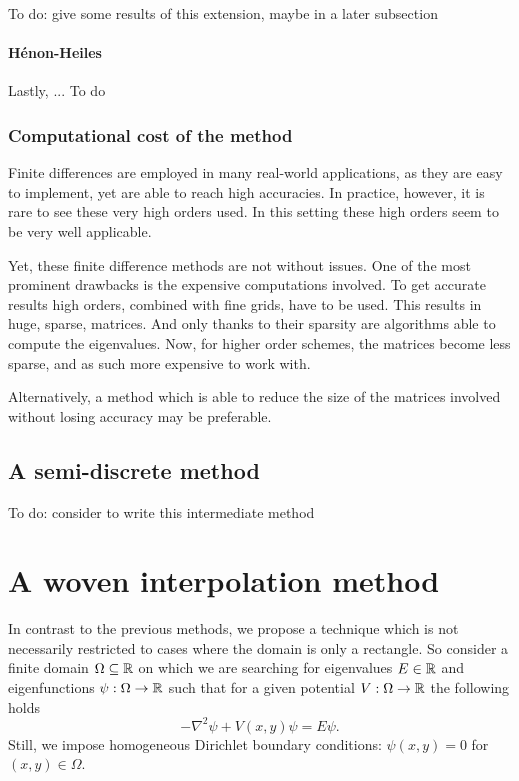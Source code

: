 {\color{red}To do: give some results of this extension, maybe in a later subsection}

\paragraph{Hénon-Heiles} Lastly, ... {\color{red}To do}


\subsubsection{Computational cost of the method}

Finite differences are employed in many real-world applications, as they are easy to implement, yet are able to reach high accuracies. In practice, however, it is rare to see these very high orders used. In this setting these high orders seem to be very well applicable.

Yet, these finite difference methods are not without issues. One of the most prominent drawbacks is the expensive computations involved. To get accurate results high orders, combined with fine grids, have to be used. This results in huge, sparse, matrices. And only thanks to their sparsity are algorithms able to compute the eigenvalues. Now, for higher order schemes, the matrices become less sparse, and as such more expensive to work with.

Alternatively, a method which is able to reduce the size of the matrices involved without losing accuracy may be preferable.

\subsection{A semi-discrete method}\label{sec:c4_semi_discrete}

{\color{red} To do: consider to write this intermediate method}

\section{A woven interpolation method}

In contrast to the previous methods, we propose a technique which is not necessarily restricted to cases where the domain is only a rectangle. So consider a finite domain $\Omega \subseteq \mathbb{R}$ on which we are searching for eigenvalues $E \in \mathbb{R}$ and eigenfunctions $\psi: \Omega \to \mathbb{R}$ such that for a given potential $V : \Omega \to \mathbb{R}$ the following holds
\begin{equation}\label{equ:c4_schrodinger_equation_new_method}
    -\nabla^2 \psi + V(x, y) \psi = E \psi\text{.}
\end{equation}
Still, we impose homogeneous Dirichlet boundary conditions: $\psi(x, y) = 0$ for $(x, y) \in \Omega$.

